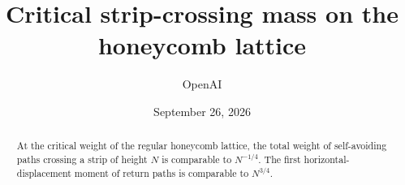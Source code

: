\documentclass[11pt,oneside]{article}
\title{Critical strip-crossing mass on the honeycomb lattice}
\author{OpenAI}
\date{September 26, 2026}
\theoremstyle{definition}
\theoremstyle{remark}
\begin{document}
\maketitle
\begin{abstract}
At the critical weight of the regular honeycomb lattice, the total weight of self-avoiding paths crossing a strip of height $N$ is comparable to $N^{-1/4}$. The first horizontal-displacement moment of return paths is comparable to $N^{3/4}$.
\end{abstract}






\appendix


\end{document}
